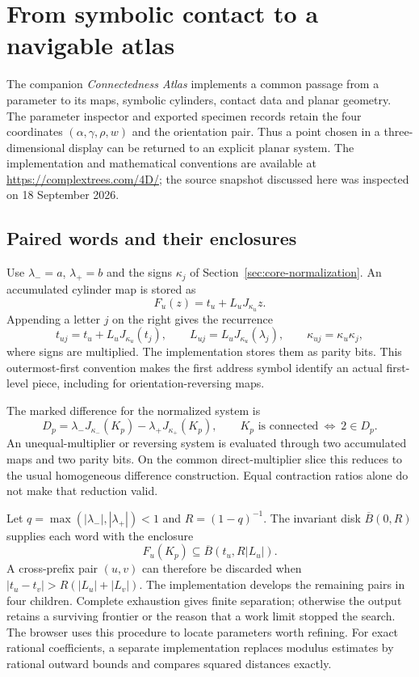 \section{From symbolic contact to a navigable atlas}
\label{sec:explorer-methods}

The companion \emph{Connectedness Atlas} implements a common passage from a
parameter to its maps, symbolic cylinders, contact data and planar geometry.
The parameter inspector and exported specimen records retain the four coordinates
$(\alpha,\gamma,\rho,w)$ and the orientation pair. Thus a point chosen in a
three-dimensional display can be returned to an explicit planar system. The
implementation and mathematical conventions are available at
\url{https://complextrees.com/4D/}; the source snapshot discussed here was
inspected on 18 September 2026.

\subsection{Paired words and their enclosures}
Use $\lambda_-=a$, $\lambda_+=b$ and the signs $\kappa_j$ of Section~\ref{sec:core-normalization}. An accumulated cylinder map is stored as
\[
F_u(z)=t_u+L_u J_{\kappa_u}z.
\]
Appending a letter $j$ on the right gives the recurrence
\begin{equation}\label{eq:atlas-prefix-recurrence}
 t_{uj}=t_u+L_u J_{\kappa_u}(t_j),\qquad
 L_{uj}=L_u J_{\kappa_u}(\lambda_j),\qquad
 \kappa_{uj}=\kappa_u\kappa_j,
\end{equation}
where signs are multiplied. The implementation stores them as parity bits. This outermost-first convention makes
the first address symbol identify an actual first-level piece, including for
orientation-reversing maps.

The marked difference for the normalized system is
\[
D_p=\lambda_- J_{\kappa_-}(K_p)-\lambda_+ J_{\kappa_+}(K_p),
\qquad K_p\text{ is connected}\ \Longleftrightarrow\ 2\in D_p.
\]
An unequal-multiplier or reversing system is evaluated through two accumulated
maps and two parity bits. On the common direct-multiplier slice this reduces to
the usual homogeneous difference construction. Equal contraction ratios alone
do not make that reduction valid.

Let $q=\max(|\lambda_-|,|\lambda_+|)<1$ and $R=(1-q)^{-1}$.
The invariant disk $\overline B(0,R)$ supplies each word with the enclosure
\[
F_u(K_p)\subseteq \overline B(t_u,R|L_u|).
\]
A cross-prefix pair $(u,v)$ can therefore be discarded when
$|t_u-t_v|>R(|L_u|+|L_v|)$. The implementation develops the remaining pairs
in four children. Complete exhaustion gives finite separation; otherwise the
output retains a surviving frontier or the reason that a work limit stopped
the search. The browser uses this procedure to locate parameters worth refining.
For exact rational coefficients, a separate implementation replaces modulus
estimates by rational outward bounds and compares squared distances exactly.

